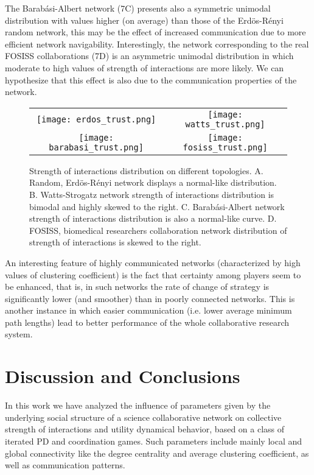 \documentclass[11pt]{article}
\begin{document}
The Barab\'asi-Albert network (7C) presents also a symmetric unimodal
distribution with values higher (on average) than those of the Erd\"{o}s-R\'enyi
random network, this may be the effect of increased communication due to more
efficient network navigability. Interestingly, the network corresponding to the
real FOSISS collaborations (7D) is an asymmetric unimodal distribution in which
moderate to high values of strength of interactions are more likely. We can
hypothesize that this effect is also due to the communication properties of the
network. 

\begin{figure} [h!]
\centering
\begin{tabular}{cc}

\texttt{[image: erdos\_trust.png]} & 
\texttt{[image: watts\_trust.png]} \\
\texttt{[image: barabasi\_trust.png]} & 
\texttt{[image: fosiss\_trust.png]}
\end{tabular}
\caption{Strength of interactions distribution on different topologies. A. Random, Erd\"{o}s-R\'enyi network displays a normal-like
  distribution. B. Watts-Strogatz network strength of interactions distribution is bimodal and highly skewed to the right. C.
  Barab\'asi-Albert network strength of interactions distribution is also a normal-like curve. D. FOSISS, biomedical researchers
  collaboration network distribution of strength of interactions is skewed to
  the right.}\label{histo_trust}  
\end{figure}

\FloatBarrier

An interesting feature of highly communicated networks (characterized by high values of clustering coefficient) is the
fact that certainty among players seem to be enhanced, that is, in such networks the rate of change of strategy is
significantly lower (and smoother) than in poorly connected networks. This is another instance in which easier
communication (i.e. lower average minimum path lengths) lead to better performance of the whole collaborative research
system.\\ 


\section{Discussion and Conclusions}
\label{sec:3}

{\color{red}In this work we have analyzed the influence of parameters given by the underlying social structure of a science
collaborative network on collective strength of interactions and utility dynamical behavior, based on a class of iterated
PD and coordination games. Such parameters include mainly local and global connectivity like the degree centrality and
average clustering coefficient, as well as communication patterns.}\\
\end{document}
